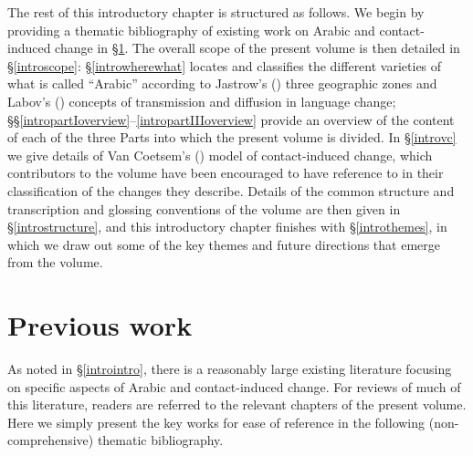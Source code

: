 \documentclass[output=paper]{langsci/langscibook}
\begin{document}
The rest of this introductory chapter is structured as follows. We begin by providing a thematic bibliography of existing work on Arabic and contact-induced change in §\ref{introexistingwork}. The overall scope of the present volume is then detailed in §\ref{introscope}: §\ref{introwherewhat} locates and classifies the different varieties of what is called ``Arabic'' according to Jastrow's (\citeyear{Jastrow2002}) three geographic zones and Labov's (\citeyear{Labov2007}) concepts of transmission and diffusion in language change; §§\ref{intropartIoverview}--\ref{intropartIIIoverview} provide an overview of the content of each of the three Parts into which the present volume is divided. In §\ref{introvc} we give details of Van Coetsem's (\citeyear{VanCoetsem1988,VanCoetsem2000}) model of contact-induced change, which contributors to the volume have been encouraged to have reference to in their classification of the changes they describe. Details of the common structure and transcription and glossing conventions of the volume are then given in §\ref{introstructure}, and this introductory chapter finishes with §\ref{introthemes}, in which we draw out some of the key themes and future directions that emerge from the volume.


\section{Previous work}\label{introexistingwork}

As noted in §\ref{introintro}, there is a reasonably large existing literature focusing on specific aspects of Arabic and contact-induced change. For reviews of much of this literature, readers are referred to the relevant chapters of the present volume. Here we simply present the key works for ease of reference in the following (non-comprehensive) thematic bibliography.
\end{document}

